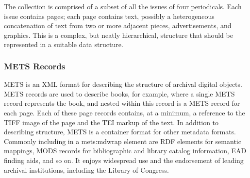 The collection is comprised of a subset of all the issues of four periodicals. Each issue contains pages; each page contains text, possibly a heterogeneous concatenation of text from two or more adjacent pieces, advertisements, and graphics. This is a complex, but neatly hierarchical, structure that should be represented in a suitable data structure. 

\subsubsection{METS Records}
METS is an XML format for describing the structure of archival digital objects. METS records are used to describe books, for example, where a single METS record represents the book, and nested within this record is a METS record for each page. Each of these page records contains, at a minimum, a reference to the TIFF image of the page and the TEI markup of the text. In addition to describing structure, METS is a container format for other metadata formats. Commonly including in a mets:mdwrap element are RDF elements for semantic mappings, MODS records for bibliographic and library catalog information, EAD finding aids, and so on. It enjoys widespread use and the endorsement of leading archival institutions, including the Library of Congress. 




